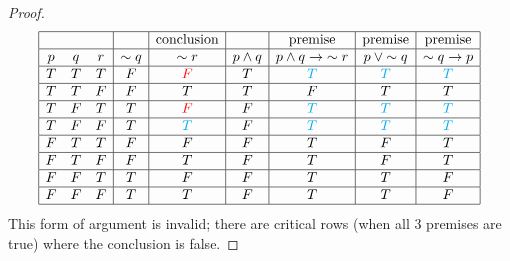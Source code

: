 \documentclass[14pt]{extarticle}
\begin{document}
\begin{proof}
    $$
        \begin{array}{|ccc|c|c|c|c|c|c|}
            \hline            &                &                &                &
            \text{conclusion} &                & \text{premise} & \text{premise} & \text{premise}                                                                           \\
            \hline
            p                 & q              & r              & {\sim q}       & {\sim r}       & p \wedge q & p \wedge q \to {\sim r} & p \vee {\sim q} & {\sim q} \to p \\
            \hline
            T                 & T              & T              & F              & \color{red} F  & T          & \color{cyan} T          & \color{cyan} T  & \color{cyan} T \\
            \hline
            T                 & T              & F              & F              & T              & T          & F                       & T               & T              \\
            \hline
            T                 & F              & T              & T              & \color{red} F  & F          & \color{cyan} T          &
            \color{cyan} T    & \color{cyan} T                                                                                                                              \\
            \hline
            T                 & F              & F              & T              & \color{cyan} T & F          & \color{cyan} T          & \color{cyan} T  & \color{cyan} T \\
            \hline
            F                 & T              & T              & F              & F              & F          & T                       & F               & T              \\
            \hline
            F                 & T              & F              & F              & T              & F          & T                       & F               & T              \\
            \hline
            F                 & F              & T              & T              & F              & F          & T                       & T               & F              \\
            \hline
            F                 & F              & F              & T              & T              & F          & T                       & T               & F              \\
            \hline
        \end{array}
    $$
    This form of argument is invalid; there are critical rows (when all 3 premises are true) where the conclusion is false. \end{proof}
\end{document}

